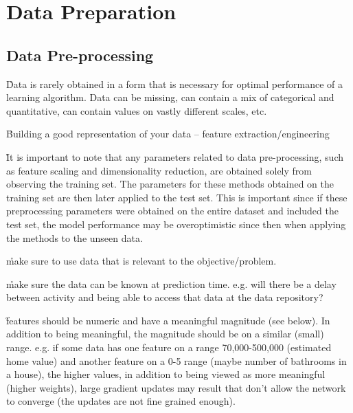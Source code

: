 \section{Data Preparation}


\subsection{Data Pre-processing}

\r{Data is rarely obtained in a form that is necessary for optimal performance of a learning algorithm. Data can be missing, can contain a mix of categorical and quantitative, can contain values on vastly different scales, etc.}

\r{Building a good representation of your data -- feature extraction/engineering}

\r{It is important to note that any parameters related to data pre-processing, such as feature scaling and dimensionality reduction, are obtained solely from observing the training set. The parameters for these methods obtained on the training set are then later applied to the test set. This is important since if these preprocessing parameters were obtained on the entire dataset and included the test set, the model performance may be overoptimistic since then when applying the methods to the unseen data.}

\r{make sure to use data that is relevant to the objective/problem.}


\r{make sure the data can be known at prediction time. e.g. will there be a delay between activity and being able to access that data at the data repository?}


\r{features should be numeric and have a meaningful magnitude (see below). In addition to being meaningful, the magnitude should be on a similar (small) range. e.g. if some data has one feature on a range 70,000-500,000 (estimated home value) and another feature on a 0-5 range (maybe number of bathrooms in a house), the higher values, in addition to being viewed as more meaningful (higher weights), large gradient updates may result that don't allow the network to converge (the updates are not fine grained enough).}


